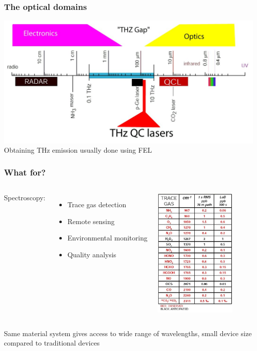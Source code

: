 \documentclass[14pt]{beamer}
\begin{document}
\begin{frame}
\begin{columns}[c]
\end{columns}
\end{frame}

\begin{frame}
\frametitle{The optical domains}
\centering
\includegraphics[width=0.8\paperwidth]{wavelengths.png}\\
Obtaining THz emission usually done using FEL

\end{frame}

\begin{frame}
\frametitle{What for?}
\begin{columns}[c]
Spectroscopy:
\begin{itemize}
\item Trace gas detection
\item Remote sensing
\item Environmental monitoring
\item Quality analysis
\end{itemize}
\includegraphics[width=4cm]{spectro.png}
\end{columns}
\alert{Same material system} gives access to \alert{wide range of wavelengths}, \alert{small device} size compared to traditional devices
\end{frame}
\end{document}
